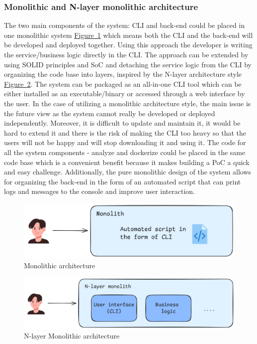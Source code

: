 \documentclass{article}
\newcommand{\FigRef}[1]{\hyperref[#1]{Figure~\ref{#1}}}
\begin{document}
\begin{multicols}{2}
\subsubsection{Monolithic and N-layer monolithic architecture}
The two main components of the system: CLI and back-end could be placed in one monolithic system \FigRef{fig:monolithic-architecture} which means both the CLI and the back-end will be developed and deployed together. Using this approach the developer is writing the service/business logic directly in the CLI. The approach can be extended by using SOLID principles and SoC and detaching the service logic from the CLI by organizing the code base into layers, inspired by the N-layer architecture style \FigRef{fig:n-layer-monolithic-architecture}. The system can be packaged as an all-in-one CLI tool which can be either installed as an executable/binary or accessed through a web interface by the user. In the case of utilizing a monolithic architecture style, the main issue is the future view as the system cannot really be developed or deployed independently. Moreover, it is difficult to update and maintain it, it would be hard to extend it and there is the risk of making the CLI too heavy so that the users will not be happy and will stop downloading it and using it. The code for all the system components - analyze and dockerize could be placed in the same code base which is a convenient benefit because it makes building a PoC a quick and easy challenge. Additionally, the pure monolithic design of the system allows for organizing the back-end in the form of an automated script that can print logs and messages to the console and improve user interaction.

\begin{figure}[H]
    \centering
    \includegraphics[width=\linewidth]{images/monolithic-architecture.png}
    \caption{Monolithic architecture}
    \label{fig:monolithic-architecture}
\end{figure}

\begin{figure}[H]
    \centering
    \includegraphics[width=\linewidth]{images/n-layer-architecture.png}
    \caption{N-layer Monolithic architecture}
    \label{fig:n-layer-monolithic-architecture}
\end{figure}


\end{multicols}
\end{document}
